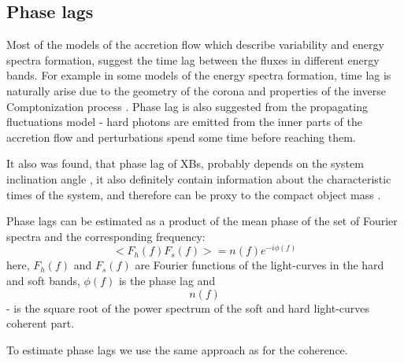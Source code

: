 

\subsection{Phase lags}
    Most of the models of the accretion flow which describe variability and energy spectra formation, suggest the time lag between the fluxes in different energy bands. 
For example in some models of the energy spectra formation, time lag is naturally arise due to the geometry of the corona and properties of the inverse Comptonization process \citep[see, e.g.][]{kotov01}.
Phase lag is also suggested from the propagating fluctuations model - hard photons are emitted from the inner parts of the accretion flow and perturbations spend some time before reaching them. 

It also was found, that phase lag of XBs, probably depends on the system inclination angle \citep{eijeden17}, it also definitely contain information about the characteristic times of the system, and therefore can be proxy to the compact object mass \citep{}. 

Phase lags can be estimated as a product of the mean phase of the set of Fourier spectra and the corresponding frequency:
$$<F_h(f)F_s(f)> = n(f)e^{-i\phi(f)}$$ 
here, $F_h(f)$ and $F_s(f)$ are Fourier functions of the light-curves in the hard and soft bands, $\phi(f)$ is the phase lag and $$n(f)$$ - is the square root of the power spectrum of the soft and hard light-curves coherent part. 

To estimate phase lags we use the same approach as for the coherence.



